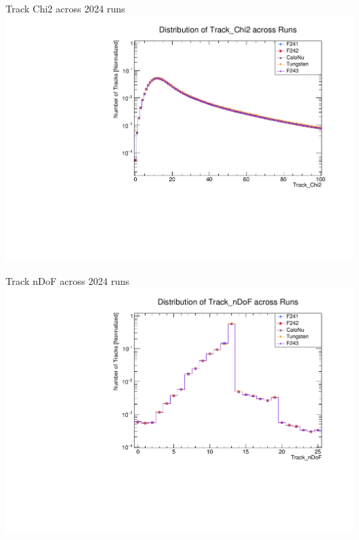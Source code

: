 \begin{frame}{Track Chi2 across 2024 runs}
	\includegraphics[width=\linewidth]{./RunwisePlots/Track_Chi2_runwise.pdf}
\end{frame}

\begin{frame}{Track nDoF across 2024 runs}
	\includegraphics[width=\linewidth]{./RunwisePlots/Track_nDoF_runwise.pdf}
\end{frame}

